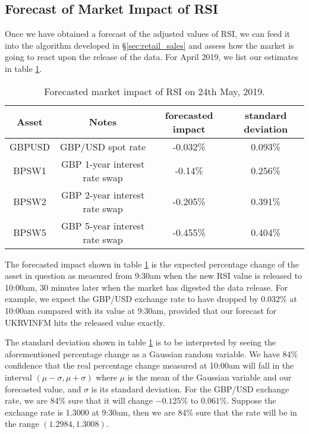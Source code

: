 \documentclass[a4paper,11pt,pdftex,twoside,titlepage]{article}
\begin{document}
\subsection{Forecast of Market Impact of RSI}
Once we have obtained a forecast of the adjusted values of RSI, we can
feed it into the algorithm developed in \S\ref{sec:retail_sales} and
assess how the market is going to react upon the release of the data.
For April 2019, we list our estimates in table \ref{tab:vfr4g54}.
\begin{table}[htb!]
  \centering
  \begin{tabular}{c|c|c|c}
    Asset & Notes & forecasted impact & standard deviation \\
    \hline
    GBPUSD & GBP/USD spot rate & -0.032\% & 0.093\% \\
    BPSW1 & GBP 1-year interest rate swap & -0.14\% & 0.256\% \\
    BPSW2 & GBP 2-year interest rate swap & -0.205\% & 0.391\% \\
    BPSW5 & GBP 5-year interest rate swap & -0.455\% & 0.404\%
  \end{tabular}
  \caption{Forecasted market impact of RSI on 24th May, 2019.}
  \label{tab:vfr4g54}
\end{table}
The forecasted impact shown in table \ref{tab:vfr4g54} is the expected
percentage change of the asset in question as measured from 9:30am
when the new RSI value is released to 10:00am, 30 minutes later when
the market has digested the data release. For example, we expect the
GBP/USD exchange rate to have dropped by 0.032\% at 10:00am
compared with its value at 9:30am, provided that our forecast for
UKRVINFM hits the released value exactly.

The standard deviation shown in table \ref{tab:vfr4g54} is to be
interpreted by seeing the aforementioned percentage change as a
Gaussian random variable. We have 84\% confidence that the real
percentage change measured at 10:00am will fall in the interval $(\mu
- \sigma, \mu + \sigma)$ where $\mu$ is the mean of the Gaussian
variable and our forecasted value, and $\sigma$ is its standard
deviation. For the GBP/USD exchange rate, we are 84\% sure that it
will change $-0.125\%$ to $0.061\%$. Suppose the exchange rate is
1.3000 at 9:30am, then we are 84\% sure that the rate will be in the
range $(1.2984, 1.3008)$.






\end{document}
